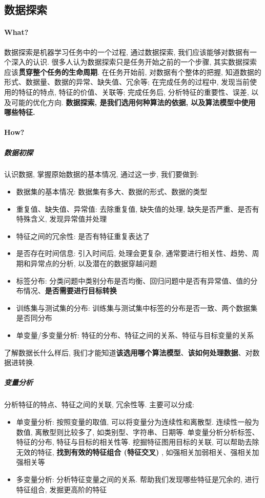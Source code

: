 \subsection{数据探索}
\paragraph{What?}数据探索是机器学习任务中的一个过程, 通过数据探索, 我们应该能够对数据有一个深入的认识. 很多人认为数据探索只是任务开始之前的一个步骤, 其实数据探索应该\textbf{贯穿整个任务的生命周期}. 在任务开始前, 对数据有个整体的把握, 知道数据的形式、数据量、数据的异常、缺失值、冗余等; 在完成任务的过程中, 发现当前使用的特征的特点, 特征的价值、关联等; 完成任务后, 分析特征的重要性、误差, 以及可能的优化方向. \textbf{数据探索, 是我们选用何种算法的依据, 以及算法模型中使用哪些特征. }

\paragraph{How?}
\subparagraph{数据初探}认识数据, 掌握原始数据的基本情况, 通过这一步, 我们要做到: 
\begin{itemize}
	\item 数据集的基本情况: 数据集有多大、数据的形式、数据的类型
	\item 重复值、缺失值、异常值: 去除重复值, 缺失值的处理, 缺失是否严重、是否有特殊含义, 发现异常值并处理
	\item 特征之间的冗余性: 是否有特征重复表达了
	\item 是否存在时间信息: 引入时间后, 处理会更复杂, 通常要进行相关性、趋势、周期和异常点的分析, 以及潜在的数据穿越问题
	\item 标签分布: 分类问题中类别分布是否均衡、回归问题中是否有异常值、值的分布情况、\textbf{是否需要进行目标转换}
	\item 训练集与测试集的分布: 训练集与测试集中标签的分布是否一致、两个数据集是否同分布
	\item 单变量/多变量分析: 特征的分布、特征之间的关系、特征与目标变量的关系
\end{itemize}
了解数据长什么样后, 我们才能知道\textbf{该选用哪个算法模型}、\textbf{该如何处理数据}、对数据进转换. 

\subparagraph{变量分析}分析特征的特点、特征之间的关联, 冗余性等. 主要可以分成: 
\begin{itemize}
	\item 单变量分析: 按照变量的取值, 可以将变量分为连续性和离散型. 连续性一般为数值, 离散型则比较多了, 如类别型、字符串、日期等. 单变量分析分析标签、特征的分布, 特征与目标的相关性等. 挖掘特征图用目标的关联, 可以帮助去除无效的特征, \textbf{找到有效的特征组合 (特征交叉) }, 如强相关加弱相关、强相关加强相关等
	
	\item 多变量分析: 分析特征变量之间的关系. 帮助我们发现哪些特征是冗余的, 进行特征组合, 发掘更高阶的特征
\end{itemize}


